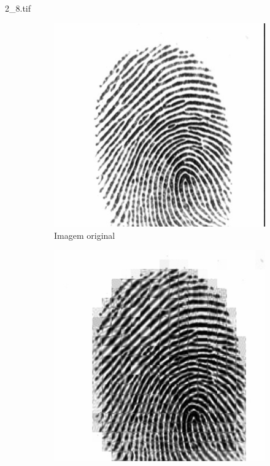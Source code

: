 \documentclass{beamer}
\begin{document}
    \begin{frame}{2\_8.tif}
        \begin{figure}
            \centering
            \begin{subfigure}[!ht]{0.32\textwidth}
                \includegraphics[width=\columnwidth]{Fingerprints/2_8.jpg}
                \caption{Imagem original}
            \end{subfigure}
            \begin{subfigure}[!ht]{0.32\textwidth}
                \includegraphics[width=\columnwidth]{Fingerprints/2_8_intermediate.jpg}

\end{subfigure}
\end{figure}
\end{frame}
\end{document}
